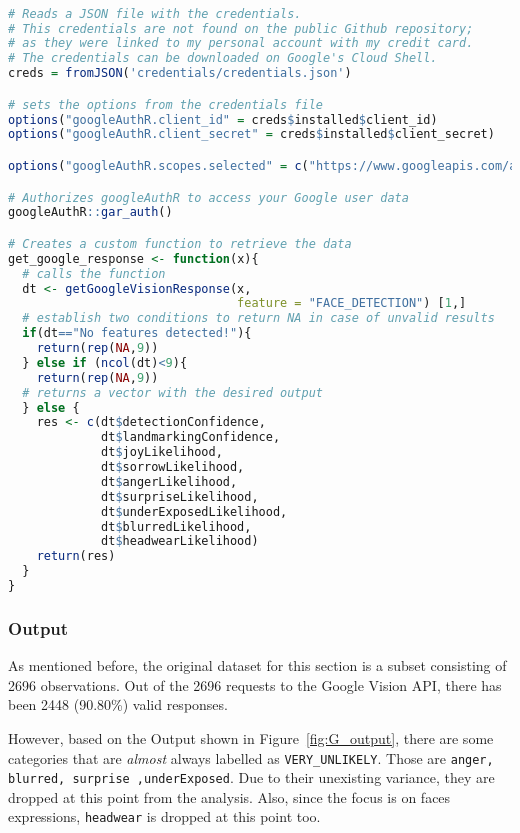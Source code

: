 \begin{lstlisting}[language={R}, frame={single}, label={lst:api_google}, caption={R Code to call the Google API and store the results}]

# Reads a JSON file with the credentials.
# This credentials are not found on the public Github repository;
# as they were linked to my personal account with my credit card.
# The credentials can be downloaded on Google's Cloud Shell.
creds = fromJSON('credentials/credentials.json')

# sets the options from the credentials file
options("googleAuthR.client_id" = creds$installed$client_id) 
options("googleAuthR.client_secret" = creds$installed$client_secret)

options("googleAuthR.scopes.selected" = c("https://www.googleapis.com/auth/cloud-platform"))

# Authorizes googleAuthR to access your Google user data
googleAuthR::gar_auth()

# Creates a custom function to retrieve the data
get_google_response <- function(x){
  # calls the function 
  dt <- getGoogleVisionResponse(x,
                                feature = "FACE_DETECTION") [1,]
  # establish two conditions to return NA in case of unvalid results
  if(dt=="No features detected!"){
    return(rep(NA,9))
  } else if (ncol(dt)<9){
    return(rep(NA,9))
  # returns a vector with the desired output
  } else {
    res <- c(dt$detectionConfidence,
             dt$landmarkingConfidence,
             dt$joyLikelihood,
             dt$sorrowLikelihood,
             dt$angerLikelihood,
             dt$surpriseLikelihood,
             dt$underExposedLikelihood,
             dt$blurredLikelihood,
             dt$headwearLikelihood)
    return(res)    
  }
}
\end{lstlisting}
\subsubsection{Output}
As mentioned before, the original dataset for this section is a subset consisting of 2696 observations. Out of the 2696 requests to the Google Vision API, there has been 2448 (90.80\%) valid responses. \par
However, based on the Output shown in Figure~\ref{fig:G_output}, there are some categories that are \textit{almost} always labelled as \texttt{VERY\_UNLIKELY}. Those are \texttt{anger, blurred, surprise ,underExposed}. Due to their unexisting variance, they are dropped at this point from the analysis. Also, since the focus is on faces expressions, \texttt{headwear} is dropped at this point too.

